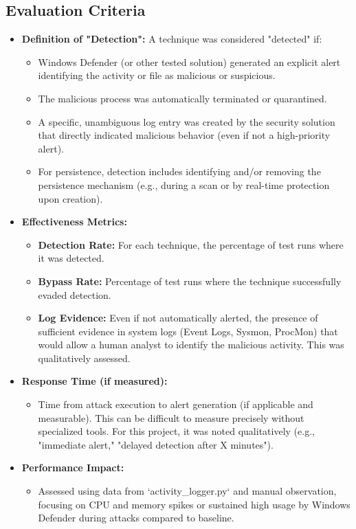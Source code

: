 \documentclass[11pt]{article}
\begin{document}
	\subsection{Evaluation Criteria}
	\begin{itemize}
		\item \textbf{Definition of "Detection":} A technique was considered "detected" if:
		\begin{itemize}
			\item Windows Defender (or other tested solution) generated an explicit alert identifying the activity or file as malicious or suspicious.
			\item The malicious process was automatically terminated or quarantined.
			\item A specific, unambiguous log entry was created by the security solution that directly indicated malicious behavior (even if not a high-priority alert).
			\item For persistence, detection includes identifying and/or removing the persistence mechanism (e.g., during a scan or by real-time protection upon creation).
		\end{itemize}
		\item \textbf{Effectiveness Metrics:}
		\begin{itemize}
			\item \textbf{Detection Rate:} For each technique, the percentage of test runs where it was detected.
			\item \textbf{Bypass Rate:} Percentage of test runs where the technique successfully evaded detection.
			\item \textbf{Log Evidence:} Even if not automatically alerted, the presence of sufficient evidence in system logs (Event Logs, Sysmon, ProcMon) that would allow a human analyst to identify the malicious activity. This was qualitatively assessed.
		\end{itemize}
		\item \textbf{Response Time (if measured):}
		\begin{itemize}
			\item Time from attack execution to alert generation (if applicable and measurable). This can be difficult to measure precisely without specialized tools. For this project, it was noted qualitatively (e.g., "immediate alert," "delayed detection after X minutes").
		\end{itemize}
		\item \textbf{Performance Impact:}
		\begin{itemize}
			\item Assessed using data from `activity_logger.py` and manual observation, focusing on CPU and memory spikes or sustained high usage by Windows Defender during attacks compared to baseline.
		\end{itemize}
	\end{itemize}
	\newpage
	
\end{document}
